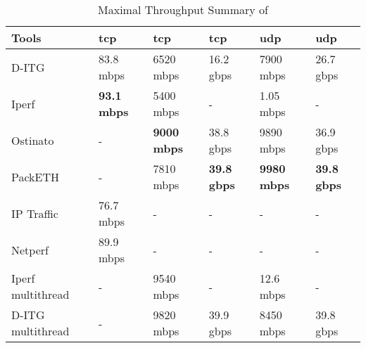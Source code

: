 \begin{table}[ht!]
    \scriptsize
    \caption{Maximal Throughput Summary of \cite{kolahi2011performance, srivastava2014evaluation, srivastava2014comparative}}
    \label{table:experimentsummary}
    \begin{adjustbox}{center}
        \renewcommand*\arraystretch{1.5}\begin{tabular}{| L{1.6cm} | L{1.7cm} | L{1.7cm} | L{1.7cm} || L{1.7cm} | L{1.7cm} |}

            \hline
            \textbf{Tools} & \textbf{\cite{kolahi2011performance} \acrshort{tcp}} & \textbf{\cite{srivastava2014evaluation} \acrshort{tcp}} & \textbf{\cite{srivastava2014comparative} \acrshort{tcp}} & \textbf{\cite{srivastava2014evaluation} \acrshort{udp}} & \textbf{\cite{srivastava2014comparative} \acrshort{udp}}
            \\ \hline
            D-ITG & 83.8 \acrshort{mbps} & 6520 \acrshort{mbps} & 16.2 \acrshort{gbps} & 7900 \acrshort{mbps} & 26.7 \acrshort{gbps}
            \\ \hline
            Iperf & \textbf{93.1 \acrshort{mbps}} & 5400 \acrshort{mbps} & - & 1.05 \acrshort{mbps} & -
            \\ \hline
            Ostinato & - & \textbf{9000 \acrshort{mbps}} & 38.8 \acrshort{gbps} & 9890 \acrshort{mbps} & 36.9 \acrshort{gbps}
            \\ \hline
            PackETH & - & 7810 \acrshort{mbps} & \textbf{39.8 \acrshort{gbps}} & \textbf{9980 \acrshort{mbps}} & \textbf{39.8 \acrshort{gbps}}
            \\ \hline
            IP Traffic & 76.7 \acrshort{mbps} & - & - & - & -
            \\ \hline
            Netperf & 89.9 \acrshort{mbps} & - & - & - & -
            \\ \hline \hline
            Iperf multithread & - & 9540 \acrshort{mbps} & - & 12.6 \acrshort{mbps} & -
            \\ \hline
            D-ITG multithread & - & 9820 \acrshort{mbps} & 39.9 \acrshort{gbps} & 8450 \acrshort{mbps} & 39.8 \acrshort{gbps}
            \\ \hline
        \end{tabular}
    \end{adjustbox}
\end{table}
